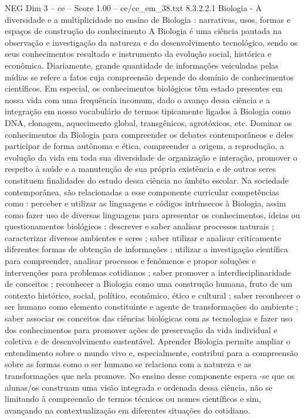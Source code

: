 \begin{textsample}{NEG Dim 3 – ce – Score 1.00 – ce/ce\_em\_38.txt}  \label{ex:f3_neg_233}
8.3.2.2.1 Biologia - A diversidade e a multiplicidade no ensino de Biologia : narrativas, usos, formas e espaços de construção do conhecimento A Biologia é uma ciência pautada na observação e investigação da natureza e do desenvolvimento tecnológico, sendo os seus conhecimentos resultado e instrumento da evolução social, histórica e econômica.
Diariamente, grande quantidade de informações veiculadas pelas mídias se refere a fatos cuja compreensão depende do domínio de conhecimentos científicos.
Em especial, os conhecimentos biológicos têm estado presentes em nossa vida com uma frequência incomum, dado o avanço dessa ciência e a integração em nosso vocabulário de termos tipicamente ligados à Biologia como DNA, clonagem, aquecimento global, transgênicos, agrotóxicos, etc.
Dominar os conhecimentos da Biologia para compreender os debates contemporâneos e deles participar de forma autônoma e ética, compreender a origem, a reprodução, a evolução da vida em toda sua diversidade de organização e interação, promover o respeito à saúde e a manutenção de sua própria existência e de outros seres constituem finalidades do estudo dessa ciência no âmbito escolar.
Na sociedade contemporânea, são relacionadas a esse componente curricular competências como : perceber e utilizar as linguagens e códigos intrínsecos à Biologia, assim como fazer uso de diversas linguagens para apresentar os conhecimentos, ideias ou questionamentos biológicos ; descrever e saber analisar processos naturais ; caracterizar diversos ambientes e seres ; saber utilizar e analisar criticamente diferentes formas de obtenção de informações ; utilizar a investigação científica para compreender, analisar processos e fenômenos e propor soluções e intervenções para problemas cotidianos ; saber promover a interdisciplinaridade de conceitos ; reconhecer a Biologia como uma construção humana, fruto de um contexto histórico, social, político, econômico, ético e cultural ; saber reconhecer o ser humano como elemento constituinte e agente de transformações do ambiente ; saber associar os conceitos das ciências biológicas com as tecnologias e fazer uso dos conhecimentos para promover ações de preservação da vida individual e coletiva e de desenvolvimento sustentável.
Aprender Biologia permite ampliar o entendimento sobre o mundo vivo e, especialmente, contribui para a compreensão sobre as formas como o ser humano se relaciona com a natureza e as transformações que nela promove.
No ensino desse componente espera -se que os alunas/os construam uma visão integrada e ordenada dessa ciência, não se limitando à compreensão de termos técnicos ou nomes científicos e sim, avançando na contextualização em diferentes situações do cotidiano.

\end{textsample}
